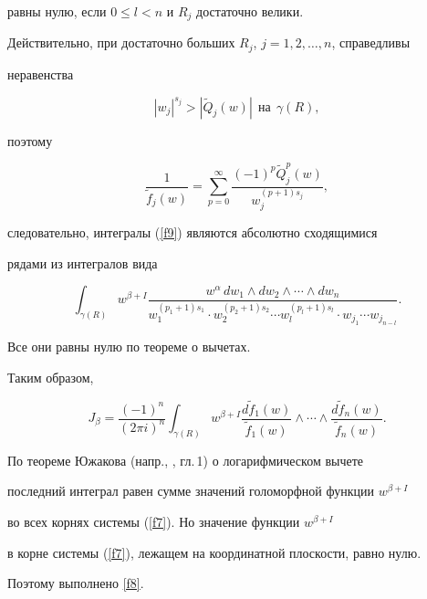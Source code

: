 \begin{pf}
равны нулю, если $0\leqslant l<n$ и $R_j$ достаточно велики.





Действительно, при достаточно больших $R_j$, $j=1,2,\dotsc, n$, справедливы


неравенства


$$


|w_j|^{s_j}>|\widetilde Q_j(w)|\ \ \text{на}\ \ \gamma(R),


$$


поэтому


$$


\frac 1{\widetilde f_j(w)}=\sum_{p=0}^\infty


\frac{(-1)^p\widetilde Q_j^p(w)}{w_j^{(p+1)s_j}},


$$


следовательно, интегралы  (\ref{f9}) являются  абсолютно сходящимися


рядами из интегралов вида


$$


\int_{\gamma(R)}w^{\beta+I}\frac{w^\alpha\, dw_1\land


dw_2\land\dotsb\land dw_n}{w_1^{(p_1+1)s_1}\cdot w_2^{(p_2+1)s_2}\dotsb


w_l^{(p_l+1)s_l}\cdot w_{j_1}\dotsb w_{j_{n-l}}}.


$$


Все они равны нулю по теореме о вычетах.





Таким образом,


$$


J_\beta=\frac{(-1)^n}{(2\pi i)^n}\int_{\gamma(R)}w^{\beta+I}


\frac{d \widetilde f_1(w)}{\widetilde f_1(w) }


\land\dotsb\land\frac{d \widetilde f_n(w)}{\widetilde f_n(w) }.


$$





По теореме Южакова (напр., \cite{1}, гл.\,1) о логарифмическом вычете


последний интеграл равен сумме значений голоморфной функции $w^{\beta+I}$


во всех корнях системы (\ref{f7}). Но значение функции $w^{\beta+I}$ 


в корне системы (\ref{f7}), лежащем на координатной плоскости, равно нулю.


Поэтому выполнено \eqref{f8}.


\end{pf}








